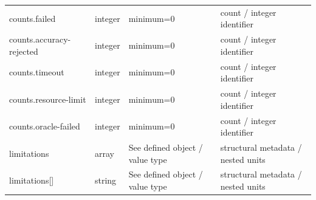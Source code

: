 \begin{longtable}{@{}>{\raggedright\arraybackslash}p{}>{\raggedright\arraybackslash}p{}>{\raggedright\arraybackslash}p{}>{\raggedright\arraybackslash}p{}@{}}
counts.\allowbreak{}failed & integer & minimum=\allowbreak{}0 & count /\allowbreak{} integer identifier\\
counts.\allowbreak{}accuracy-\allowbreak{}rejected & integer & minimum=\allowbreak{}0 & count /\allowbreak{} integer identifier\\
counts.\allowbreak{}timeout & integer & minimum=\allowbreak{}0 & count /\allowbreak{} integer identifier\\
counts.\allowbreak{}resource-\allowbreak{}limit & integer & minimum=\allowbreak{}0 & count /\allowbreak{} integer identifier\\
counts.\allowbreak{}oracle-\allowbreak{}failed & integer & minimum=\allowbreak{}0 & count /\allowbreak{} integer identifier\\
limitations & array & See defined object /\allowbreak{} value type & structural metadata /\allowbreak{} nested units\\
limitations[] & string & See defined object /\allowbreak{} value type & structural metadata /\allowbreak{} nested units\\
\end{longtable}\endgroup
